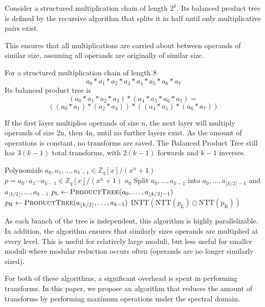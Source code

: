\documentclass[runningheads]{llncs}
\begin{document}
Consider a structured multiplication chain of length $2^k$. Its balanced product tree is defined by the recursive algorithm that splits it in half until only multiplicative pairs exist.

This ensures that all multiplications are carried about between operands of similar size, assuming all operands are originally of similar size.
\begin{example}
    For a structured multiplication chain of length 8
    $$a_0* a_1 * a_2 * a_3 * a_4 * a_5 * a_6 * a_7$$
    Its balanced product tree is
    $$(a_0* a_1 * a_2 * a_3) * ( a_4 * a_5 * a_6 * a_7)=$$
    $$((a_0 * a_1)* (a_2 * a_3))* ((a_4 * a_5)* (a_6* a_7))$$
\end{example}
If the first layer multiplies operands of size n, the next layer will multiply operands of size 2n, then 4n, until no further layers exist. As the amount of operations is constant, no transforms are saved. The Balanced Product Tree still has $3(k-1)$ total transforms, with $2(k-1)$ forwards and $k-1$ inverses.

\begin{algorithm}
\caption{Balanced Product Tree}
\begin{algorithmic}[1]
\Require Polynomials $a_0, a_1, \dots, a_{k-1} \in \mathbb{Z}_q[x]/(x^n+1)$
\Ensure $p = a_0 \cdot a_1 \cdots a_{k-1} \in \mathbb{Z}_q[x]/(x^n+1)$
    \State \Return $a_0$
\EndIf
\State Split $a_0, \dots, a_{k-1}$ into $a_0, \dots, a_{\lfloor k/2 \rfloor - 1}$ and $a_{\lfloor k/2 \rfloor}, \dots, a_{k-1}$
\State $p_{\mathrm{L}} \gets \Call{ProductTree}{a_0, \dots, a_{\lfloor k/2 \rfloor - 1}}$
\State $p_{\mathrm{R}} \gets \Call{ProductTree}{a_{\lfloor k/2 \rfloor}, \dots, a_{k-1}}$
\State \Return $\mathrm{INTT}(\mathrm{NTT}(p_{\mathrm{L}}) \odot \mathrm{NTT}(p_{\mathrm{R}}))$
\end{algorithmic}
\end{algorithm}

As each branch of the tree is independent, this algorithm is highly parallelizable. In addition, the algorithm ensures that similarly sizes operands are multiplied at every level. This is useful for relatively large moduli, but less useful for smaller moduli where modular reduction occurs often (operands are no longer similarly sized).

For both of these algorithms, a significant overhead is spent in performing transforms. In this paper, we propose an algorithm that reduces the amount of transforms by performing maximum operations under the spectral domain.
\end{document}
